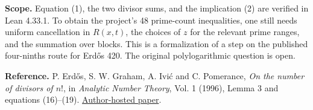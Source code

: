 \documentclass[10pt]{article}
\begin{document}
\textbf{Scope.} Equation (1), the two divisor sums, and the implication (2) are verified in Lean 4.33.1. To obtain the project's 48 prime-count inequalities, one still needs uniform cancellation in $R(x,t)$, the choices of $z$ for the relevant prime ranges, and the summation over blocks. This is a formalization of a step on the published four-ninths route for Erd\H{o}s 420. The original polylogarithmic question is open.

{\small\textbf{Reference.} P. Erd\H{o}s, S. W. Graham, A. Ivi\'c and C. Pomerance, \emph{On the number of divisors of $n!$}, in \emph{Analytic Number Theory}, Vol. 1 (1996), Lemma 3 and equations (16)--(19). \href{https://math.dartmouth.edu/~carlp/factorial.pdf}{Author-hosted paper}.}
\end{document}

